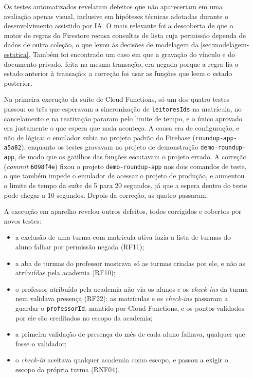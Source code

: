 Os testes automatizados revelaram defeitos que não apareceriam em uma
avaliação apenas visual, inclusive em hipóteses técnicas adotadas
durante o desenvolvimento assistido por IA. O mais relevante foi a descoberta de que o
motor de regras do Firestore recusa consultas de lista cuja permissão
dependa de dados de outra coleção, o que levou às decisões de modelagem
da \autoref{sec:modelagem-estatica}. Também foi encontrado um caso em que
a gravação do vínculo e do documento privado, feita na mesma transação,
era negada porque a regra lia o estado anterior à transação; a correção
foi usar as funções que leem o estado posterior.

Na primeira execução da suíte de Cloud Functions, só um dos quatro testes
passou: os três que esperavam a sincronização de \texttt{leitoresIds} na
matrícula, no cancelamento e na reativação pararam pelo limite de tempo,
e o único aprovado era justamente o que espera que nada aconteça. A causa
era de configuração, e não de lógica: o emulador subia no projeto
padrão do Firebase (\texttt{roundup-app-a5a82}), enquanto os testes
gravavam no projeto de demonstração \texttt{demo-roundup-app}, de modo
que os gatilhos das funções escutavam o projeto errado. A correção
(\textit{commit} \texttt{6098f4e}) fixou o projeto
\texttt{demo-roundup-app} nos dois comandos de teste, o que também impede
o emulador de acessar o projeto de produção, e aumentou o limite de tempo
da suíte de 5 para 20 segundos, já que a espera dentro do teste pode
chegar a 10 segundos. Depois da correção, as quatro passaram.

A execução em aparelho revelou outros defeitos, todos corrigidos e
cobertos por novos testes:

\begin{itemize}
  \item a exclusão de uma turma com matrícula ativa fazia a lista de
        turmas do aluno falhar por permissão negada (RF11);
  \item a aba de turmas do professor mostrava só as turmas criadas por
        ele, e não as atribuídas pela academia (RF10);
  \item o professor atribuído pela academia não via os alunos e os
        \textit{check-ins} da turma nem validava presença (RF22); as
        matrículas e os \textit{check-ins} passaram a guardar o
        \texttt{professorId}, mantido por Cloud Functions, e os pontos
        validados por ele são creditados no escopo da academia;
  \item a primeira validação de presença do mês de cada aluno falhava,
        qualquer que fosse o validador;
  \item o \textit{check-in} aceitava qualquer academia como escopo, e
        passou a exigir o escopo da própria turma (RNF04).
\end{itemize}